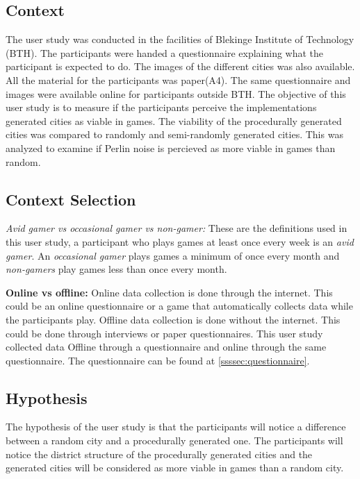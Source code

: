 	\subsection{Context}
	The user study was conducted in the facilities of Blekinge Institute of Technology (BTH). The participants were handed a questionnaire explaining what the participant is expected to do. The images of the different cities was also available. All the material for the participants was paper(A4). The same questionnaire and images were available online for participants outside BTH. The objective of this user study is to measure if the participants perceive the implementations generated cities as viable in games. The viability of the procedurally generated cities was compared to randomly and semi-randomly generated cities. This was analyzed to examine if Perlin noise is percieved as more viable in games than random.
	
		
	\subsection{Context Selection}
	\textit{Avid gamer vs occasional gamer vs non-gamer:} These are the definitions used in this user study, a participant who plays games at least once every week is an \textit{avid gamer}. An \textit{occasional gamer} plays games a minimum of once every month and \textit{non-gamers} play games less than once every month. 
			
	\textbf{Online vs offline: }
	Online data collection is done through the internet. This could be an online questionnaire or a game that automatically collects data while the participants play. Offline data collection is done without the internet. This could be done through interviews or paper questionnaires. This user study collected data Offline through a questionnaire and online through the same questionnaire. The questionnaire can be found at \ref{ssssec:questionnaire}.
			
	\subsection{Hypothesis}
	The hypothesis of the user study is that the participants will notice a difference between a random city and a procedurally generated one. The participants will notice the district structure of the procedurally generated cities and the generated cities will be considered as more viable in games than a random city.
			
